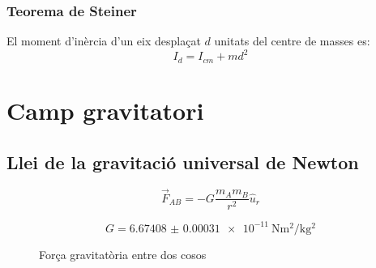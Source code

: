 \subsubsection{Teorema de Steiner}
El moment d'inèrcia d'un eix desplaçat $d$ unitats del centre de masses es:
\begin{equation}
    I_d = I_{cm} + m d^2
\end{equation}

\section{Camp gravitatori}
\label{sec:camp_gravitatori}

\subsection{Llei de la gravitació universal de Newton}
\label{sub:llei_de_la_gravitacio_universal}
\begin{equation} \label{eq:gravitacio_universal}
    \vec{F}_{AB} = -G\frac{m_Am_B}{r^2} \hat{u}_r
\end{equation}

\begin{equation}\label{eq:constant_grav_universal}
    G = \SI{6.67408(31)e-11}{\newton\metre\squared\per\kilo\gram\squared}
\end{equation}

\begin{figure}[H]
    \centering
    \caption{Força gravitatòria entre dos cosos}
    \label{fig:forca_grav}
\end{figure}

\vspace{1cm}


